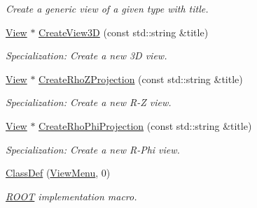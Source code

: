 \begin{DoxyCompactItemize}
\begin{DoxyCompactList}\small\item\em Create a generic view of a given type with title. \item\end{DoxyCompactList}\item 
\hyperlink{class_d_d4hep_1_1_view}{View} $\ast$ \hyperlink{class_d_d4hep_1_1_view_menu_a6fe4cbbcdf7aa56913ae390730d8d12f}{CreateView3D} (const std::string \&title)
\begin{DoxyCompactList}\small\item\em Specialization: Create a new 3D view. \item\end{DoxyCompactList}\item 
\hyperlink{class_d_d4hep_1_1_view}{View} $\ast$ \hyperlink{class_d_d4hep_1_1_view_menu_a1ef807a24d6a871036cd738e45a8cedf}{CreateRhoZProjection} (const std::string \&title)
\begin{DoxyCompactList}\small\item\em Specialization: Create a new R-\/Z view. \item\end{DoxyCompactList}\item 
\hyperlink{class_d_d4hep_1_1_view}{View} $\ast$ \hyperlink{class_d_d4hep_1_1_view_menu_a66ee705a3132333b27a1eed2ea6caeea}{CreateRhoPhiProjection} (const std::string \&title)
\begin{DoxyCompactList}\small\item\em Specialization: Create a new R-\/Phi view. \item\end{DoxyCompactList}\item 
\hyperlink{class_d_d4hep_1_1_view_menu_ae114589d23508b5e814581c6b198858b}{ClassDef} (\hyperlink{class_d_d4hep_1_1_view_menu}{ViewMenu}, 0)
\begin{DoxyCompactList}\small\item\em \hyperlink{namespace_r_o_o_t}{ROOT} implementation macro. \item\end{DoxyCompactList}\end{DoxyCompactItemize}
